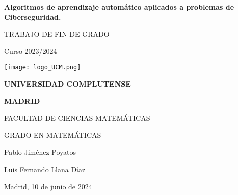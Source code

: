 \documentclass[11pt, a4paper]{article} %
\begin{document}
\begin{titlepage}
	
	
    \centering
	
	{\LARGE \textbf{Algoritmos de aprendizaje automático aplicados a problemas de Ciberseguridad.}\par}
    
	\vfill
	\vfill 
    
    {\LARGE \textsc{TRABAJO DE FIN DE GRADO}\par}
    
    \vspace*{0.2 cm}	 
    
    {\Large Curso 2023/2024\par}
    
    \vfill
    \vfill   
	
    \texttt{[image: logo\_UCM.png]}\par
	
	\vfill  
    
    {\Large \textsc{\textbf{UNIVERSIDAD COMPLUTENSE}}\par}
    {\Large \textsc{\textbf{MADRID}}\par}
    
    
	\vfill   
	\vfill 
	\vfill  
	\vfill 
    
    {\Large FACULTAD DE CIENCIAS MATEMÁTICAS \par}
        
    {\Large GRADO EN MATEMÁTICAS \par}
    
    \vfill
	\vfill
	\vfill 
	\vfill 
    

    \begin{minipage}{0.8\textwidth}
        \begin{flushleft}
            {\Large Pablo Jiménez Poyatos}
        \end{flushleft}
    \end{minipage}
    
    \vfill
    
    
    \begin{minipage}{0.8\textwidth}
        \begin{flushleft}
            {\Large Luis Fernando Llana Díaz}
        \end{flushleft}
    \end{minipage}

    \vfill
    \vfill
    \vfill 

	\begin{minipage}{0.75\textwidth}
    	    \begin{flushright}
    	    		{\Large Madrid, 10 de junio de 2024}  
		\end{flushright}        	           
	\end{minipage}     
     
    
\end{titlepage}
\end{document}
